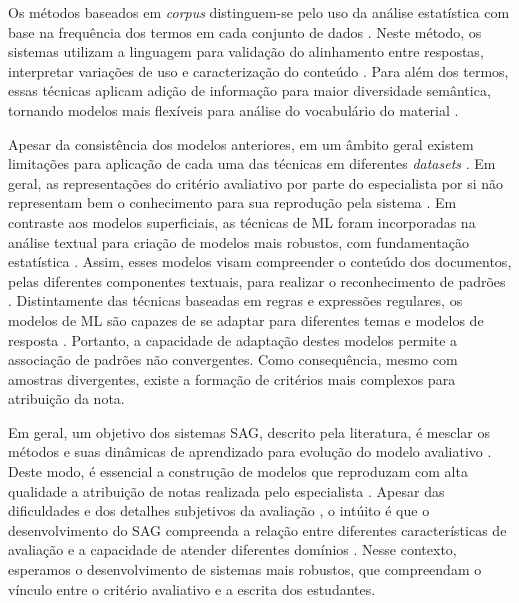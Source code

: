 Os métodos baseados em \textit{corpus} distinguem-se pelo uso da análise estatística com base na frequência dos termos em cada conjunto de dados \cite{kumar2019}. Neste método, os sistemas utilizam a linguagem para validação do alinhamento entre respostas, interpretar variações de uso e caracterização do conteúdo \cite{ziai2012, menini2019}. Para além dos termos, essas técnicas aplicam adição de informação para maior diversidade semântica, tornando modelos mais flexíveis para análise do vocabulário do material \cite{fowler2021}.

Apesar da consistência dos modelos anteriores, em um âmbito geral existem limitações para aplicação de cada uma das técnicas em diferentes \textit{datasets} \cite{riordan2019, ding2020}. Em geral, as representações do critério avaliativo por parte do especialista por si não representam bem o conhecimento para sua reprodução pela sistema \cite{filighera2020}. Em contraste aos modelos superficiais, as técnicas de ML foram incorporadas na análise textual para criação de modelos mais robustos, com fundamentação estatística \cite{galhardi2018b}. Assim, esses modelos visam compreender o conteúdo dos documentos, pelas diferentes componentes textuais, para realizar o reconhecimento de padrões \cite{suzen2020}. Distintamente das técnicas baseadas em regras e expressões regulares, os modelos de ML são capazes de se adaptar para diferentes temas e modelos de resposta \cite{zhang2016, saha2019, camus2020}. Portanto, a capacidade de adaptação destes modelos permite a associação de padrões não convergentes. Como consequência, mesmo com amostras divergentes, existe a formação de critérios mais complexos para atribuição da nota.

Em geral, um objetivo dos sistemas SAG, descrito pela literatura, é mesclar os métodos e suas dinâmicas de aprendizado para evolução do modelo avaliativo \cite{burrows2015, zesch2018}. Deste modo, é essencial a construção de modelos que reproduzam com alta qualidade a atribuição de notas realizada pelo especialista \cite{jordan2012}. Apesar das dificuldades e dos detalhes subjetivos da avaliação \cite{roy2018}, o intúito é que o desenvolvimento do SAG compreenda a relação entre diferentes características de avaliação e a capacidade de atender diferentes domínios \cite{sung2019a, saha2019}. Nesse contexto, esperamos o desenvolvimento de sistemas mais robustos, que compreendam o vínculo entre o critério avaliativo e a escrita dos estudantes.